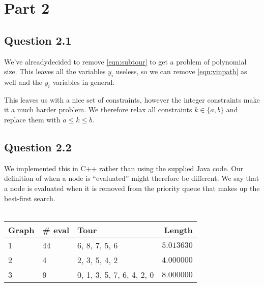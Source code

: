 \documentclass{sig-alternate}
\begin{document}
\section*{Part 2}
\subsection*{Question 2.1}

We've alreadydecided to remove \autoref{eqn:subtour} to get a problem of
polynomial size. This leaves all the variables $y_i$ useless, so we can
remove \autoref{eqn:vinpath} as well and the $y_i$ variables in general.

This leaves us with a nice set of constraints, however the integer constraints
make it a much harder problem. We therefore relax all constraints
$k\in \{a, b\}$ and replace them with $a\le k \le b$.

\subsection*{Question 2.2}
We implemented this in C++ rather than using the supplied Java code. Our
definition of when a node is ``evaluated'' might therefore be different. We say
that a node is evaluated when it is removed from the priority queue that makes
up the best-first search.
\\\\
\begin{tabular}{| l | l | l | r |}
\hline
\textbf{Graph} & \textbf{\# eval} & \textbf{Tour} & \textbf{Length} \\
\hline
1              & 44              & 6, 8, 7, 5, 6 & $5.013630$      \\
2              & 4               & 2, 3, 5, 4, 2 & $4.000000$      \\
3              & 9               & 0, 1, 3, 5, 7, 6, 4, 2, 0 & $8.000000$ \\
\hline
\end{tabular}

\end{document}
